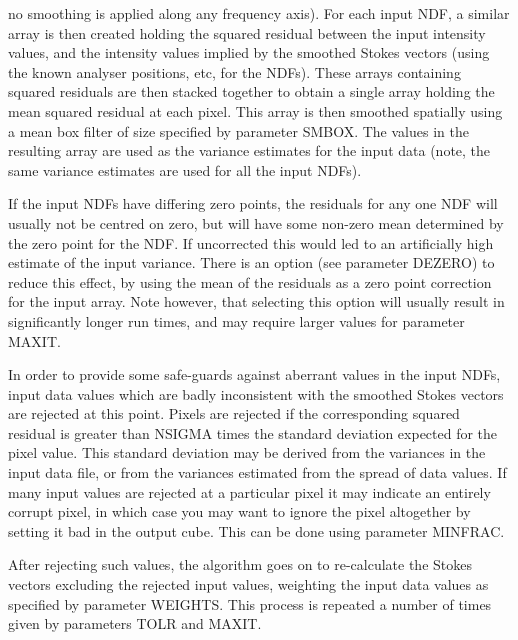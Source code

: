 \documentclass[twoside,11pt]{starlink}
\begin{document}
{{{         \sstitem
         no smoothing is applied along any frequency axis). For each input
         NDF, a similar array is then created holding the squared residual
         between the input intensity values, and the intensity values implied
         by the smoothed Stokes vectors (using the known analyser positions,
         etc, for the NDFs). These arrays containing squared residuals are
         then stacked together to obtain a single array holding the mean
         squared residual at each pixel. This array is then smoothed spatially
         using a mean box filter of size specified by parameter SMBOX. The
         values in the resulting array are used as the variance estimates for
         the input data (note, the same variance estimates are used for all
         the input NDFs).

      }
      If the input NDFs have differing zero points, the residuals
      for any one NDF will usually not be centred on zero, but will
      have some non-zero mean determined by the zero point for the
      NDF. If uncorrected this would led to an artificially high
      estimate of the input variance. There is an option (see parameter
      DEZERO) to reduce this effect, by using the mean of the residuals
      as a zero point correction for the input array. Note however, that
      selecting this option will usually result in significantly
      longer run times, and may require larger values for parameter
      MAXIT.

      In order to provide some safe-guards against aberrant values in
      the input NDFs, input data values which are badly inconsistent
      with the smoothed Stokes vectors are rejected at this point. Pixels
      are rejected if the corresponding squared residual is greater than
      NSIGMA times the standard deviation expected for the pixel value.
      This standard deviation may be derived from the variances in the
      input data file, or from the variances estimated from the spread
      of data values. If many input values are rejected at a particular
      pixel it may indicate an entirely corrupt pixel, in which case you
      may want to ignore the pixel altogether by setting it bad in the
      output cube. This can be done using parameter MINFRAC.

      After rejecting such values, the algorithm goes on to re-calculate
      the Stokes vectors excluding the rejected input values, weighting
      the input data values as specified by parameter WEIGHTS. This
      process is repeated a number of times given by parameters TOLR
      and MAXIT.

}}
\end{document}
